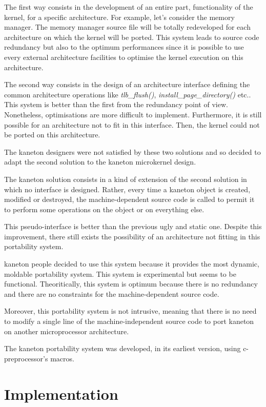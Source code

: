 \begin{multicols}{2}
The first way consists in the development of an entire part, functionality
of the kernel, for a specific architecture. For example, let's consider the
memory manager. The memory manager source file will be totally redeveloped
for each architecture on which the kernel will be ported. This system leads
to source code redundancy but also to the optimum performances since
it is possible to use every external architecture facilities to optimise
the kernel execution on this architecture.

The second way consists in the design of an architecture interface defining
the common architecture operations like \textit{tlb\_flush()},
\textit{install\_page\_directory()} etc.. This system is better than the
first from the redundancy point of view. Nonetheless, optimisations are more
difficult to implement. Furthermore, it is still possible for an architecture
not to fit in this interface. Then, the kernel could not be ported on
this architecture.

The kaneton designers were not satisfied by these two solutions and so
decided to adapt the second solution to the kaneton microkernel design.

The kaneton solution consists in a kind of extension of the second solution
in which no interface is designed. Rather, every time a kaneton object is
created, modified or destroyed, the machine-dependent source code is called
to permit it to perform some operations on the object or on everything else.

This pseudo-interface is better than the previous ugly and static one.
Despite this improvement, there still exists the possibility of an
architecture not fitting in this portability system.

kaneton people decided to use this system because it provides the most
dynamic, moldable portability system. This system is experimental but
seems to be functional. Theoritically, this system is optimum because
there is no redundancy and there are no constraints for the
machine-dependent source code.

Moreover, this portability system is not intrusive, meaning that there
is no need to modify a single line of the machine-independent source code
to port kaneton on another microprocessor architecture.

The kaneton portability system was developed, in its earliest version,
using c-preprocessor's macros.

%
%

\section{Implementation}


\end{multicols}
